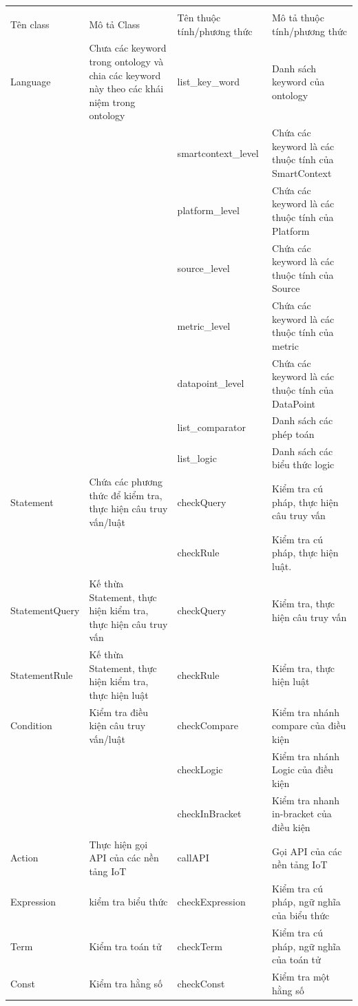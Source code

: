 \begin{longtable}{|p{30mm}|p{40mm}|p{30mm}|p{40mm}|}
\hline
\multicolumn{4}{c|}{}\\
Tên class & Mô tả Class & Tên thuộc tính/phương thức& Mô tả thuộc tính/phương thức\\
\hline
Language & Chưa các keyword trong ontology và chia các keyword này theo các khái niệm trong ontology & list\_key\_word & Danh sách keyword của ontology\\
\cline{3-4}
&& smartcontext\_level & Chứa các keyword là các thuộc tính của SmartContext \\
\cline{3-4}
&& platform\_level & Chứa các keyword là các thuộc tính của Platform \\
\cline{3-4}
&& source\_level & Chứa các keyword là các thuộc tính của Source \\
\cline{3-4}
&& metric\_level & Chứa các keyword là các thuộc tính của metric\\
\cline{3-4}
&& datapoint\_level & Chứa các keyword là các thuộc tính của DataPoint\\
\cline{3-4}
&& list\_comparator & Danh sách các phép toán \\
\cline{3-4}
&& list\_logic & Danh sách các biểu thức logic \\
\hline
Statement & Chứa các phương thức để kiểm tra, thực hiện câu truy vấn/luật & checkQuery & Kiểm tra cú pháp, thực hiện câu truy vấn \\
\cline{3-4}
&& checkRule & Kiểm tra cú pháp, thực hiện luật.\\
\hline
StatementQuery & Kế thừa Statement, thực hiện kiểm tra, thực hiện câu truy vấn & checkQuery & Kiểm tra, thực hiện câu truy vấn\\
\hline
StatementRule & Kế thừa Statement, thực hiện kiểm tra, thực hiện luật & checkRule & Kiểm tra, thực hiện luật\\
\hline
Condition & Kiểm tra điều kiện câu truy vấn/luật & checkCompare & Kiểm tra nhánh compare của điều kiện\\
\cline{3-4}
&& checkLogic & Kiểm tra nhánh Logic của điều kiện\\
\cline{3-4}
&& checkInBracket & Kiểm tra nhanh in-bracket của điều kiện\\
\hline
Action & Thực hiện gọi API của các nền tảng IoT & callAPI & Gọi API của các nền tảng IoT\\
\hline
Expression & kiểm tra biểu thức & checkExpression & Kiểm tra cú pháp, ngữ nghĩa của biểu thức\\
\hline
Term & Kiểm tra toán tử & checkTerm & Kiểm tra cú pháp, ngữ nghĩa của toán tử\\
\hline
Const & Kiểm tra hằng số & checkConst & Kiểm tra một hằng số\\
\hline

\end{longtable}

